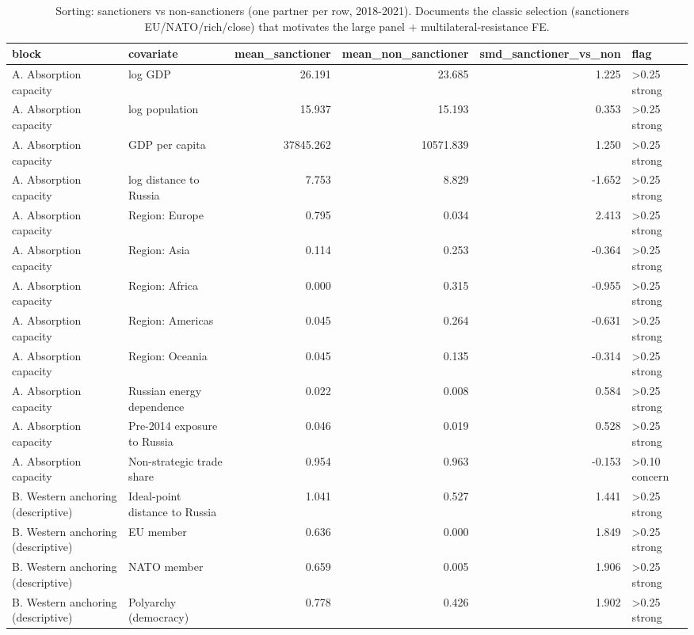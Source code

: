 \begin{table}

\caption{Sorting: sanctioners vs non-sanctioners (one partner per row, 2018-2021). Documents the classic selection (sanctioners ~ EU/NATO/rich/close) that motivates the large panel + multilateral-resistance FE.}
\centering
\begin{tabular}[t]{llrrrl}
\toprule
block & covariate & mean\_sanctioner & mean\_non\_sanctioner & smd\_sanctioner\_vs\_non & flag\\
\midrule
A. Absorption capacity & log GDP & 26.191 & 23.685 & 1.225 & >0.25 strong\\
A. Absorption capacity & log population & 15.937 & 15.193 & 0.353 & >0.25 strong\\
A. Absorption capacity & GDP per capita & 37845.262 & 10571.839 & 1.250 & >0.25 strong\\
A. Absorption capacity & log distance to Russia & 7.753 & 8.829 & -1.652 & >0.25 strong\\
A. Absorption capacity & Region: Europe & 0.795 & 0.034 & 2.413 & >0.25 strong\\
A. Absorption capacity & Region: Asia & 0.114 & 0.253 & -0.364 & >0.25 strong\\
A. Absorption capacity & Region: Africa & 0.000 & 0.315 & -0.955 & >0.25 strong\\
A. Absorption capacity & Region: Americas & 0.045 & 0.264 & -0.631 & >0.25 strong\\
A. Absorption capacity & Region: Oceania & 0.045 & 0.135 & -0.314 & >0.25 strong\\
A. Absorption capacity & Russian energy dependence & 0.022 & 0.008 & 0.584 & >0.25 strong\\
A. Absorption capacity & Pre-2014 exposure to Russia & 0.046 & 0.019 & 0.528 & >0.25 strong\\
A. Absorption capacity & Non-strategic trade share & 0.954 & 0.963 & -0.153 & >0.10 concern\\
B. Western anchoring (descriptive) & Ideal-point distance to Russia & 1.041 & 0.527 & 1.441 & >0.25 strong\\
B. Western anchoring (descriptive) & EU member & 0.636 & 0.000 & 1.849 & >0.25 strong\\
B. Western anchoring (descriptive) & NATO member & 0.659 & 0.005 & 1.906 & >0.25 strong\\
B. Western anchoring (descriptive) & Polyarchy (democracy) & 0.778 & 0.426 & 1.902 & >0.25 strong\\
\bottomrule
\end{tabular}
\end{table}
